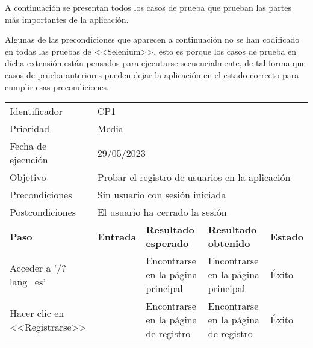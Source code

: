 A continuación se presentan todos los casos de prueba que prueban las partes más
importantes de la aplicación.

Algunas de las precondiciones que aparecen a continuación no se han codificado
en todas las pruebas de <<Selenium>>, esto es porque los casos de prueba en
dicha extensión están pensados para ejecutarse secuencialmente, de tal forma que
casos de prueba anteriores pueden dejar la aplicación en el estado correcto para
cumplir esas precondiciones.

\begin{table}[H]
\begin{tabular}{p{}p{}p{}p{}p{}}
\rowcolor{gray!25}
Identificador   & \multicolumn{4}{l}{CP1}                                                    \\
Prioridad   & \multicolumn{4}{l}{Media}                                                    \\
\rowcolor{gray!25}
Fecha de ejecución   & \multicolumn{4}{l}{29/05/2023}                                                    \\
Objetivo        & \multicolumn{4}{l}{Probar el registro de usuarios en la aplicación}                                                     \\
\rowcolor{gray!25}
Precondiciones  & \multicolumn{4}{l}{Sin usuario con sesión iniciada}                                                     \\
Postcondiciones & \multicolumn{4}{l}{El usuario ha cerrado la sesión}                                                     \\ \hline
\rowcolor{gray!25}
\textbf{Paso}   & \textbf{Entrada} & \textbf{Resultado esperado} & \textbf{Resultado obtenido} & \textbf{Estado} \\ \hline
Acceder a '/?lang=es'                               &                                                                                                         & Encontrarse en la página principal                                   & Encontrarse en la página principal                                   & Éxito                            \\ \hline
Hacer clic en <<Registrarse>>                       &                                                                                                          & Encontrarse en la página de registro                                 & Encontrarse en la página de registro                                 & Éxito                            \\ \hline

\end{tabular}
\end{table}
